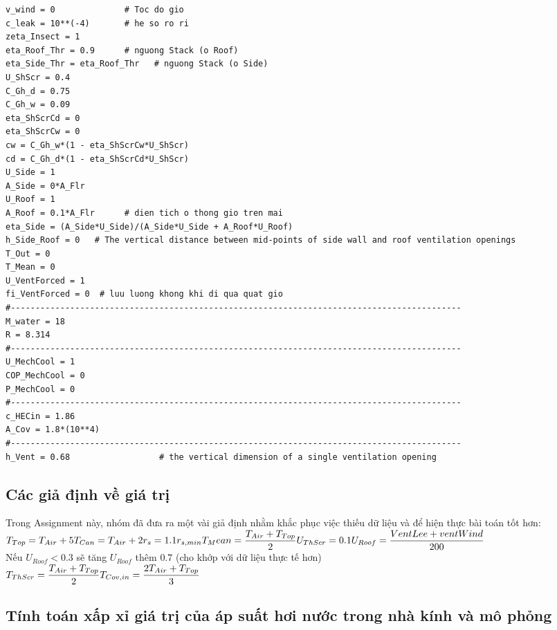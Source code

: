 \documentclass[13pt,a4paper]{article}
\begin{document}
\begin{lstlisting}
v_wind = 0     			# Toc do gio
c_leak = 10**(-4)     	# he so ro ri
zeta_Insect = 1   
eta_Roof_Thr = 0.9     	# nguong Stack (o Roof)
eta_Side_Thr = eta_Roof_Thr   # nguong Stack (o Side)
U_ShScr = 0.4 
C_Gh_d = 0.75
C_Gh_w = 0.09
eta_ShScrCd = 0
eta_ShScrCw = 0
cw = C_Gh_w*(1 - eta_ShScrCw*U_ShScr)
cd = C_Gh_d*(1 - eta_ShScrCd*U_ShScr)
U_Side = 1
A_Side = 0*A_Flr
U_Roof = 1
A_Roof = 0.1*A_Flr      # dien tich o thong gio tren mai
eta_Side = (A_Side*U_Side)/(A_Side*U_Side + A_Roof*U_Roof)
h_Side_Roof = 0   # The vertical distance between mid-points of side wall and roof ventilation openings
T_Out = 0    
T_Mean = 0   
U_VentForced = 1 
fi_VentForced = 0  # luu luong khong khi di qua quat gio
#-------------------------------------------------------------------------------------------
M_water = 18   
R = 8.314       
#-------------------------------------------------------------------------------------------
U_MechCool = 1  
COP_MechCool = 0 
P_MechCool = 0  
#-------------------------------------------------------------------------------------------
c_HECin = 1.86  
A_Cov = 1.8*(10**4)  
#-------------------------------------------------------------------------------------------
h_Vent = 0.68                  # the vertical dimension of a single ventilation opening
\end{lstlisting}
		
		\subsection{Các giả định về giá trị}
			Trong Assignment này, nhóm đã đưa ra một vài giả định nhằm khắc phục việc thiếu dữ liệu và để hiện thực bài toán tốt hơn: \\
			$
				T_{Top} = T_{Air} + 5 \\
				T_{Can} = T_{Air} + 2 \\
				r_s = 1.1r_{s,min} \\
				T_Mean = \dfrac{T_{Air} + T_{Top}}{2} \\
				U_{ThScr} = 0.1 \\
				U_{Roof} = \dfrac{VentLee + ventWind}{200}$ \\
				Nếu $U_{Roof} < 0.3$ sẽ tăng $U_{Roof}$ thêm $0.7$ (cho khớp với dữ liệu thực tế hơn) \\
				$T_{ThScr} = \dfrac{T_{Air} + T_{Top}}{2} \\
				T_{Cov,in} = \dfrac{2T_{Air} + T_{Top}}{3}
			$
			
		\subsection{Tính toán xấp xỉ giá trị của áp suất hơi nước trong nhà kính và mô phỏng}
\end{document}

